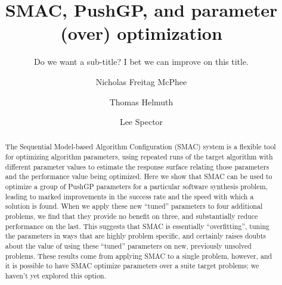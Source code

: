 \documentclass[sigconf]{acmart}
\begin{document}
\title{SMAC, PushGP, and parameter (over) optimization}
\subtitle{Do we want a sub-title? I bet we can improve on this title.}

\author{Nicholas Freitag McPhee}

\author{Thomas Helmuth}

\author{Lee Spector}

\begin{abstract}
	The Sequential Model-based Algorithm Configuration (SMAC) system is a
	flexible tool for optimizing algorithm parameters, using repeated runs
	of the target algorithm with different parameter values to estimate
	the response surface relating those parameters and the performance
	value being optimized. Here we show that SMAC can be used to optimize
	a group of PushGP parameters for a particular software synthesis problem,
	leading to marked improvements in the success rate and the speed with which
	a solution is found. When we apply these new ``tuned'' parameters to four
	additional problems, we find that they provide no benefit on three, and
	substantially reduce performance on the last. This suggests that SMAC 
	is essentially ``overfitting'', tuning the parameters in ways that are 
	highly problem specific, and certainly raises doubts about the value of
	using these ``tuned'' parameters on new, previously unsolved problems.
	These results come from applying SMAC to a single problem, however, and it
	is possible to have SMAC optimize parameters over a suite target problems;
	we haven't yet explored this option.
	
\end{abstract}
\end{document}
